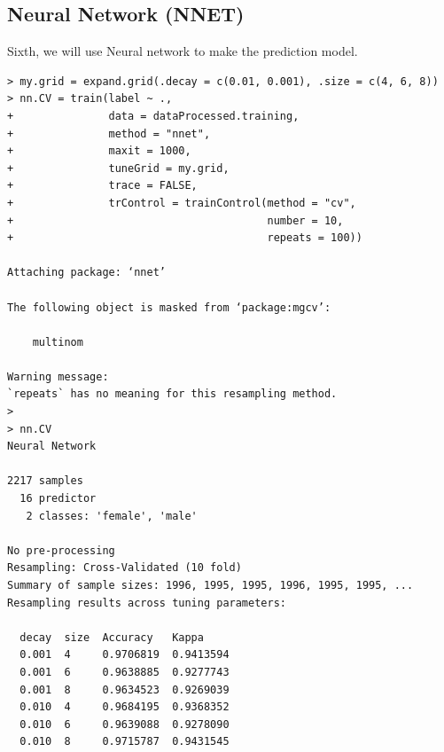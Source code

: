 \documentclass{article}%
\begin{document}
\subsection{Neural Network (NNET)}
Sixth, we will use Neural network to make the prediction model.
\begin{verbatim}> my.grid = expand.grid(.decay = c(0.01, 0.001), .size = c(4, 6, 8))
> nn.CV = train(label ~ .,
+               data = dataProcessed.training,
+               method = "nnet",
+               maxit = 1000,
+               tuneGrid = my.grid,
+               trace = FALSE,
+               trControl = trainControl(method = "cv",
+                                        number = 10,
+                                        repeats = 100))

Attaching package: ‘nnet’

The following object is masked from ‘package:mgcv’:

    multinom

Warning message:
`repeats` has no meaning for this resampling method.
>
> nn.CV
Neural Network

2217 samples
  16 predictor
   2 classes: 'female', 'male'

No pre-processing
Resampling: Cross-Validated (10 fold)
Summary of sample sizes: 1996, 1995, 1995, 1996, 1995, 1995, ...
Resampling results across tuning parameters:

  decay  size  Accuracy   Kappa
  0.001  4     0.9706819  0.9413594
  0.001  6     0.9638885  0.9277743
  0.001  8     0.9634523  0.9269039
  0.010  4     0.9684195  0.9368352
  0.010  6     0.9639088  0.9278090
  0.010  8     0.9715787  0.9431545


\end{verbatim}
\end{document}
